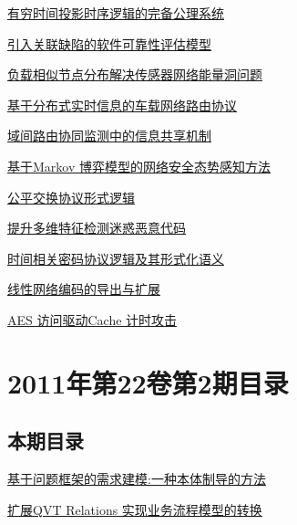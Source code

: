 \documentclass[a4paper]{article}
\begin{document}
\href{http://www.jos.org.cn/ch/reader/download_pdf.aspx?file_no=3918&year_id=2011&quarter_id=3&falg=1}{有穷时间投影时序逻辑的完备公理系统}

\href{http://www.jos.org.cn/ch/reader/download_pdf.aspx?file_no=3739&year_id=2011&quarter_id=3&falg=1}{引入关联缺陷的软件可靠性评估模型}

\href{http://www.jos.org.cn/ch/reader/download_pdf.aspx?file_no=3944&year_id=2011&quarter_id=3&falg=1}{负载相似节点分布解决传感器网络能量洞问题}

\href{http://www.jos.org.cn/ch/reader/download_pdf.aspx?file_no=3808&year_id=2011&quarter_id=3&falg=1}{基于分布式实时信息的车载网络路由协议}

\href{http://www.jos.org.cn/ch/reader/download_pdf.aspx?file_no=3734&year_id=2011&quarter_id=3&falg=1}{域间路由协同监测中的信息共享机制}

\href{http://www.jos.org.cn/ch/reader/download_pdf.aspx?file_no=3751&year_id=2011&quarter_id=3&falg=1}{基于Markov 博弈模型的网络安全态势感知方法}

\href{http://www.jos.org.cn/ch/reader/download_pdf.aspx?file_no=3945&year_id=2011&quarter_id=3&falg=1}{公平交换协议形式逻辑}

\href{http://www.jos.org.cn/ch/reader/download_pdf.aspx?file_no=3727&year_id=2011&quarter_id=3&falg=1}{提升多维特征检测迷惑恶意代码}

\href{http://www.jos.org.cn/ch/reader/download_pdf.aspx?file_no=3732&year_id=2011&quarter_id=3&falg=1}{时间相关密码协议逻辑及其形式化语义}

\href{http://www.jos.org.cn/ch/reader/download_pdf.aspx?file_no=3737&year_id=2011&quarter_id=3&falg=1}{线性网络编码的导出与扩展}

\href{http://www.jos.org.cn/ch/reader/download_pdf.aspx?file_no=3802&year_id=2011&quarter_id=3&falg=1}{AES 访问驱动Cache 计时攻击}


\section{\textbf{2011年第22卷第2期目录}}
\subsection{本期目录}
\href{http://www.jos.org.cn/ch/reader/download_pdf.aspx?file_no=3755&year_id=2011&quarter_id=2&falg=1}{基于问题框架的需求建模:一种本体制导的方法}

\href{http://www.jos.org.cn/ch/reader/download_pdf.aspx?file_no=3753&year_id=2011&quarter_id=2&falg=1}{扩展QVT Relations 实现业务流程模型的转换}
\end{document}
